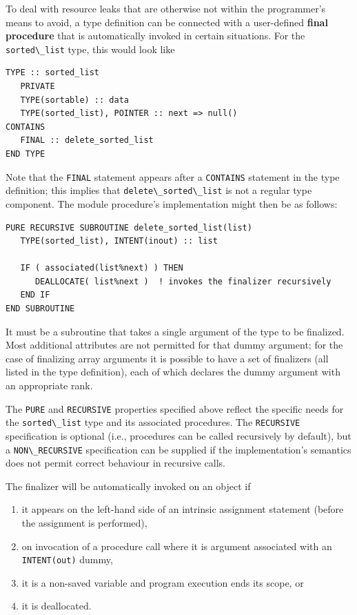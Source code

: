 \documentclass[
  paper=a4,
  ,captions=tableheading
]{scrartcl}
\newcommand{\passthrough}[1]{#1}
\providecommand{\tightlist}{%
  \setlength{\itemsep}{0pt}\setlength{\parskip}{0pt}}
\begin{document}
To deal with resource leaks that are otherwise not within the
programmer's means to avoid, a type definition can be connected with a
user-defined \textbf{final procedure} that is automatically invoked in
certain situations. For the \passthrough{\lstinline!sorted\_list!} type,
this would look like

\begin{lstlisting}
TYPE :: sorted_list
   PRIVATE
   TYPE(sortable) :: data
   TYPE(sorted_list), POINTER :: next => null()
CONTAINS
   FINAL :: delete_sorted_list
END TYPE
\end{lstlisting}

Note that the \passthrough{\lstinline!FINAL!} statement appears after a
\passthrough{\lstinline!CONTAINS!} statement in the type definition;
this implies that \passthrough{\lstinline!delete\_sorted\_list!} is not
a regular type component. The module procedure's implementation might
then be as follows:

\begin{lstlisting}
PURE RECURSIVE SUBROUTINE delete_sorted_list(list)
   TYPE(sorted_list), INTENT(inout) :: list

   IF ( associated(list%next) ) THEN
      DEALLOCATE( list%next )  ! invokes the finalizer recursively
   END IF
END SUBROUTINE
\end{lstlisting}

It must be a subroutine that takes a single argument of the type to be
finalized. Most additional attributes are not permitted for that dummy
argument; for the case of finalizing array arguments it is possible to
have a set of finalizers (all listed in the type definition), each of
which declares the dummy argument with an appropriate rank.

The \passthrough{\lstinline!PURE!} and
\passthrough{\lstinline!RECURSIVE!} properties specified above reflect
the specific needs for the \passthrough{\lstinline!sorted\_list!} type
and its associated procedures. The \passthrough{\lstinline!RECURSIVE!}
specification is optional (i.e., procedures can be called recursively by
default), but a \passthrough{\lstinline!NON\_RECURSIVE!} specification
can be supplied if the implementation's semantics does not permit
correct behaviour in recursive calls.

The finalizer will be automatically invoked on an object if

\begin{enumerate}
\def\labelenumi{\arabic{enumi}.}
\tightlist
\item
  it appears on the left-hand side of an intrinsic assignment statement
  (before the assignment is performed),
\item
  on invocation of a procedure call where it is argument associated with
  an \passthrough{\lstinline!INTENT(out)!} dummy,
\item
  it is a non-saved variable and program execution ends its scope, or
\item
  it is deallocated.
\end{enumerate}
\end{document}

